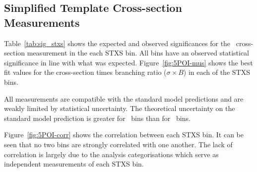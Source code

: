 \subsection{Simplified Template Cross-section Measurements}
Table~\ref{tab:sig_stxs} shows the expected and observed significances for
the \VHbb\ cross-section measurement in the each STXS bin. All bins have an
observed statistical significance in line with what was expected.
Figure~\ref{fig:5POI-mus} shows the best fit values for the cross-section times
branching ratio ($\sigma \times B$) in each of the STXS bins.

All measurements are compatible with the standard model predictions and are
weakly limited by statistical uncertainty. The theoretical uncertainty on the
standard  model prediction is greater for \ZH\ bins than for \WH\ bins.

Figure~\ref{fig:5POI-corr} shows the correlation between each STXS bin. It can
be seen that no two bins are strongly correlated with one another. The lack of
correlation is largely due to the analysis categorisations which serve as
independent measurements of each STXS bin.

%
%
